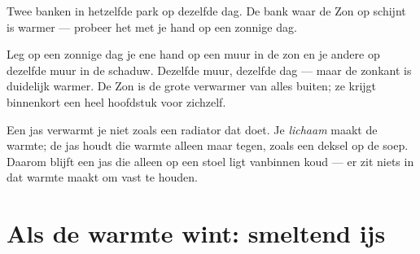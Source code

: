 \begin{omfigure}

{\small Twee banken in hetzelfde park op dezelfde dag. De bank waar de
Zon op schijnt is warmer --- probeer het met je hand op een zonnige
dag.}
\end{omfigure}

\begin{example}\label{ex:g1:hot-and-cold:sunshade}
Leg op een zonnige dag je ene hand op een muur in de zon en je andere
op dezelfde muur in de schaduw. Dezelfde muur, dezelfde dag --- maar
de zonkant is duidelijk warmer. De Zon is de grote verwarmer van
alles buiten; ze krijgt binnenkort een heel hoofdstuk voor zichzelf.
\end{example}

\begin{remark}\label{rem:g1:hot-and-cold:coat}
Een jas verwarmt je niet zoals een radiator dat doet. Je
\emph{lichaam} maakt de warmte; de jas houdt die warmte alleen maar
tegen, zoals een deksel op de soep. Daarom blijft een jas die alleen
op een stoel ligt vanbinnen koud --- er zit niets in dat warmte maakt
om vast te houden.
\end{remark}

\section{Als de warmte wint: smeltend ijs}

